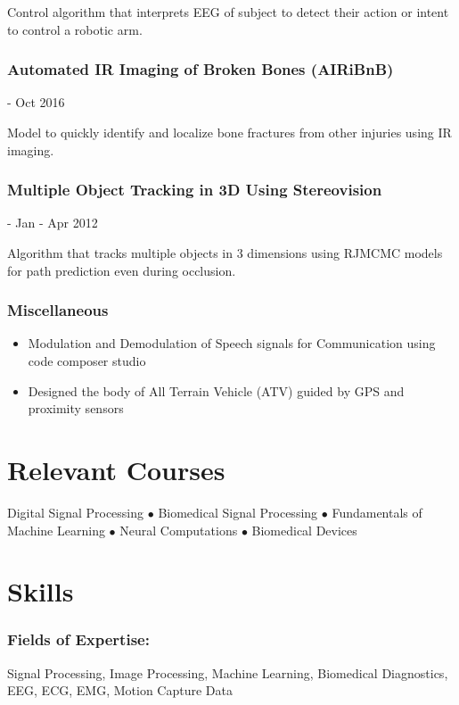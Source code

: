 \documentclass{article}
\begin{document}
Control algorithm that interprets EEG of subject to detect their action or intent to control a robotic arm.

 \subsubsection{Automated IR Imaging of Broken Bones (AIRiBnB)} - Oct 2016
 
Model to quickly identify and localize bone fractures from other injuries using IR imaging.
    
\subsubsection{Multiple Object Tracking in 3D Using Stereovision} - Jan - Apr 2012

Algorithm that tracks multiple objects in 3 dimensions using RJMCMC models for path prediction even during occlusion.
    
\subsubsection{Miscellaneous}
\begin{itemize}
    \item Modulation and Demodulation of Speech signals for Communication using code composer studio 
    \item Designed the body of All Terrain Vehicle (ATV) guided by GPS and proximity sensors  
\end{itemize}


\section{Relevant Courses}
Digital Signal Processing $\bullet$ Biomedical Signal Processing $\bullet$ Fundamentals of Machine Learning $\bullet$ Neural Computations $\bullet$ Biomedical Devices


\section{Skills}
\subsubsection{Fields of Expertise:} 
Signal Processing, Image Processing, Machine Learning, Biomedical Diagnostics, EEG, ECG, EMG, Motion Capture Data
\end{document}
